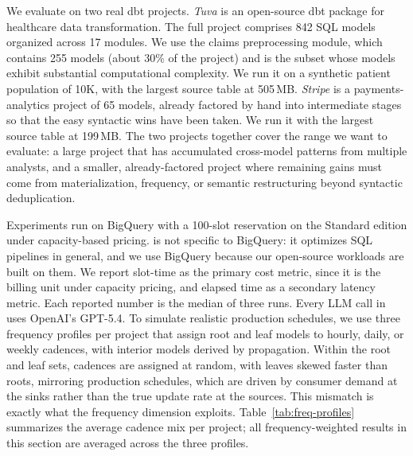 We evaluate on two real dbt projects. \emph{Tuva} is an open-source dbt package for healthcare data transformation. The full project comprises 842 SQL models organized across 17 modules. We use the claims preprocessing module, which contains 255 models (about 30\% of the project) and is the subset whose models exhibit substantial computational complexity. We run it on a synthetic patient population of 10K, with the largest source table at 505\,MB. \emph{Stripe} is a payments-analytics project of 65 models, already factored by hand into intermediate stages so that the easy syntactic wins have been taken. We run it with the largest source table at 199\,MB. The two projects together cover the range we want to evaluate: a large project that has accumulated cross-model patterns from multiple analysts, and a smaller, already-factored project where remaining gains must come from materialization, frequency, or semantic restructuring beyond syntactic deduplication.

Experiments run on BigQuery with a 100-slot reservation on the Standard edition under capacity-based pricing.
\tool{} is not specific to BigQuery: it optimizes SQL pipelines in general, and we use BigQuery because our open-source workloads are built on them. We report slot-time as the primary cost metric, since it is the billing unit under capacity pricing, and elapsed time as a secondary latency metric. Each reported number is the median of three runs. Every LLM call in \tool{} uses OpenAI's GPT-5.4. To simulate realistic production schedules, we use three frequency profiles per project that assign root and leaf models to hourly, daily, or weekly cadences, with interior models derived by propagation. Within the root and leaf sets, cadences are assigned at random, with
leaves skewed faster than roots, mirroring production schedules, which
are driven by consumer demand at the sinks rather than the true update
rate at the sources. This mismatch is exactly what the frequency
dimension exploits. Table~\ref{tab:freq-profiles} summarizes the average cadence mix per project; all frequency-weighted results in this section are averaged across the three profiles.


